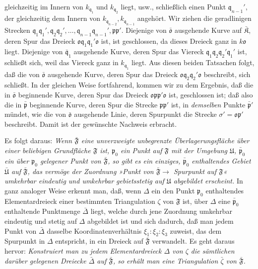 \documentclass{article}
\begin{document}
gleichzeitig im Innern von $k_{\mathfrak{q}_1}$ und $k_{\mathfrak{q}_2}$ liegt, usw., schließlich einen Punkt $\mathfrak{q}_{n-1}'$, der gleichzeitig dem Innern von $k_{\mathfrak{q}_{n-2}}, k_{\mathfrak{q}_{n-1}}$ angehört. Wir ziehen die geradlinigen Strecken $\mathfrak{q}_1\mathfrak{q}_1', \mathfrak{q}_2\mathfrak{q}_2', \dots, \mathfrak{q}_{n-1}\mathfrak{q}_{n-1}', \mathfrak{p}\mathfrak{p}'$. Diejenige von $\bar{\mathfrak{o}}$ ausgehende Kurve auf $\bar{\mathfrak{K}}$, deren Spur das Dreieck $\mathfrak{o}\mathfrak{q}_1\mathfrak{q}_1'\mathfrak{o}$ ist, ist geschlossen, da dieses Dreieck ganz in $k\mathfrak{o}$ liegt. Diejenige von $\bar{\mathfrak{q}}_1$ ausgehende Kurve, deren Spur das Viereck $\mathfrak{q}_1\mathfrak{q}_2\mathfrak{q}_2'\mathfrak{q}_1'$ ist, schließt sich, weil das Viereck ganz in $k_{\mathfrak{q}_1}$ liegt. Aus diesen beiden Tatsachen folgt, daß die von $\bar{\mathfrak{o}}$ ausgehende Kurve, deren Spur das Dreieck $\mathfrak{o}\mathfrak{q}_2\mathfrak{q}_2'\mathfrak{o}$ beschreibt, sich schließt. In der gleichen Weise fortfahrend, kommen wir zu dem Ergebnis, daß die in $\bar{\mathfrak{o}}$ beginnende Kurve, deren Spur das Dreieck $\mathfrak{o}\mathfrak{p}\mathfrak{p}'\mathfrak{o}$ ist, geschlossen ist; daß also die in $\bar{\mathfrak{p}}$ beginnende Kurve, deren Spur die Strecke $\mathfrak{p}\mathfrak{p}'$ ist, in \emph{demselben} Punkte $\bar{\mathfrak{p}}'$ mündet, wie die von $\bar{\mathfrak{o}}$ ausgehende Linie, deren Spurpunkt die Strecke $\sigma' = \mathfrak{o}\mathfrak{p}'$ beschreibt. Damit ist der gewünschte Nachweis erbracht.

Es folgt daraus: \emph{Wenn $\bar{\mathfrak{F}}$ eine unverzweigte unbegrenzte Überlagerungsfläche über einer beliebigen Grundfläche $\mathfrak{F}$ ist, $\mathfrak{p}_0$ ein Punkt auf $\mathfrak{F}$ mit der Umgebung $\mathfrak{U}$, $\bar{\mathfrak{p}}_0$ ein über $\mathfrak{p}_0$ gelegener Punkt von $\bar{\mathfrak{F}}$, so gibt es ein einziges, $\bar{\mathfrak{p}}_0$ enthaltendes Gebiet $\bar{\mathfrak{U}}$ auf $\bar{\mathfrak{F}}$, das vermöge der Zuordnung »Punkt von $\bar{\mathfrak{F}} \to$ Spurpunkt auf $\mathfrak{F}$« umkehrbar eindeutig und umkehrbar gebietsstetig auf $\mathfrak{U}$ abgebildet erscheint.} In ganz analoger Weise erkennt man, daß, wenn $\Delta$ ein den Punkt $\mathfrak{p}_0$ enthaltendes Elementardreieck einer bestimmten Triangulation $\zeta$ von $\mathfrak{F}$ ist, über $\Delta$ eine $\bar{\mathfrak{p}}_0$ enthaltende Punktmenge $\bar{\Delta}$ liegt, welche durch jene Zuordnung umkehrbar eindeutig und stetig auf $\Delta$ abgebildet ist und sich dadurch, daß man jedem Punkt von $\bar{\Delta}$ dasselbe Koordinatenverhältnis $\xi_1 : \xi_2 : \xi_3$ zuweist, das dem Spurpunkt in $\Delta$ entspricht, in ein Dreieck auf $\bar{\mathfrak{F}}$ verwandelt. Es geht daraus hervor: \emph{Konstruiert man zu jedem Elementardreieck $\Delta$ von $\zeta$ die sämtlichen darüber gelegenen Dreiecke $\bar{\Delta}$ auf $\bar{\mathfrak{F}}$, so erhält man eine Triangulation $\bar{\zeta}$ von $\bar{\mathfrak{F}}$.}
\end{document}
